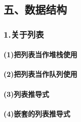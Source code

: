 \documentclass{article}
\begin{document}
\begin{CJK}{UTF8}{gbsn}
\part*{五、数据结构}
\section*{1.关于列表}
\subsection*{(1)把列表当作堆栈使用}
\subsection*{(2)把列表当作队列使用}
\subsection*{(3)列表推导式}
\subsection*{(4)嵌套的列表推导式}
\end{CJK}
\end{document}
